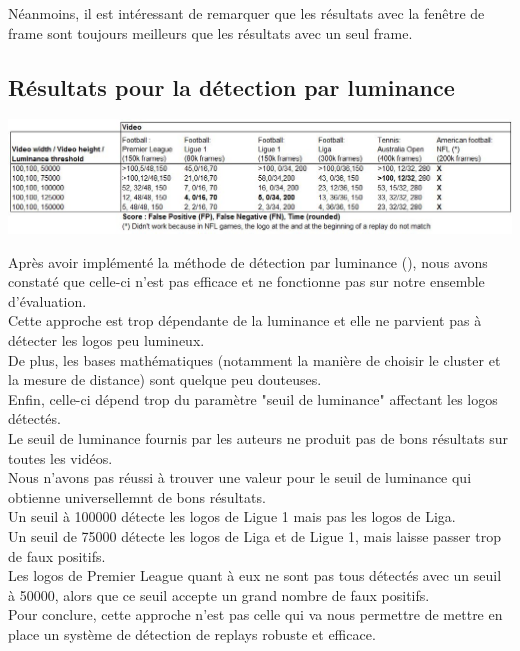 \documentclass[11pt]{article}
\begin{document}
Néanmoins, il est intéressant de remarquer que les résultats avec la fenêtre de frame sont toujours meilleurs que les résultats avec un seul frame.\\
\subsection{Résultats pour la détection par luminance}
\label{sec:orgeb2cd95}
\begin{center}
\includegraphics[width=15cm]{robust_res.JPG}
\end{center}
Après avoir implémenté la méthode de détection par luminance (\cite{xu11_robus_replay_detec_algor_soccer_video}), nous avons constaté que celle-ci n'est pas efficace et ne fonctionne pas sur notre ensemble d'évaluation.\\
Cette approche est trop dépendante de la luminance et elle ne parvient pas à détecter les logos peu lumineux.\\
De plus, les bases mathématiques (notamment la manière de choisir le cluster et la mesure de distance) sont quelque peu douteuses.\\
Enfin, celle-ci dépend trop du paramètre "seuil de luminance" affectant les logos détectés.\\
Le seuil de luminance fournis par les auteurs ne produit pas de bons résultats sur toutes les vidéos.\\
Nous n'avons pas réussi à trouver une valeur pour le seuil de luminance qui obtienne universellemnt de bons résultats.\\
Un seuil à 100000 détecte les logos de Ligue 1 mais pas les logos de Liga.\\
Un seuil de 75000 détecte les logos de Liga et de Ligue 1, mais laisse passer trop de faux positifs.\\
Les logos de Premier League quant à eux ne sont pas tous détectés avec un seuil à 50000, alors que ce seuil accepte un grand nombre de faux positifs.\\

Pour conclure, cette approche n'est pas celle qui va nous permettre de mettre en place un système de détection de replays robuste et efficace.\\
\end{document}
